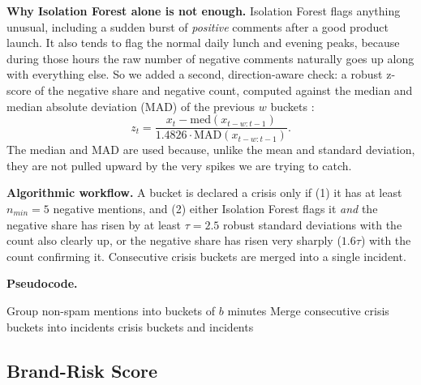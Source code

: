\documentclass[12pt,a4paper]{report}
\newcommand{\be}{\begin{equation}}
\newcommand{\ee}{\end{equation}}
\begin{document}
\textbf{Why Isolation Forest alone is not enough.} Isolation Forest flags anything unusual, including a sudden burst of \textit{positive} comments after a good product launch. It also tends to flag the normal daily lunch and evening peaks, because during those hours the raw number of negative comments naturally goes up along with everything else. So we added a second, direction-aware check: a robust z-score of the negative share and negative count, computed against the median and median absolute deviation (MAD) of the previous $w$ buckets \cite{rousseeuw1993}:
\be
z_t = \frac{x_t - \mathrm{med}(x_{t-w:t-1})}{1.4826 \cdot \mathrm{MAD}(x_{t-w:t-1})}.
\ee
The median and MAD are used because, unlike the mean and standard deviation, they are not pulled upward by the very spikes we are trying to catch.

\textbf{Algorithmic workflow.} A bucket is declared a crisis only if (1) it has at least $n_{min} = 5$ negative mentions, and (2) either Isolation Forest flags it \textit{and} the negative share has risen by at least $\tau = 2.5$ robust standard deviations with the count also clearly up, or the negative share has risen very sharply ($1.6\tau$) with the count confirming it. Consecutive crisis buckets are merged into a single incident.

\textbf{Pseudocode.}

\begin{algorithm}[H]
\caption{Crisis Detection using Isolation Forest and Robust Z-Score}
Group non-spam mentions into buckets of $b$ minutes\;
Merge consecutive crisis buckets into incidents\;
\Return crisis buckets and incidents\;
\end{algorithm}

\subsection{Brand-Risk Score}
\end{document}

